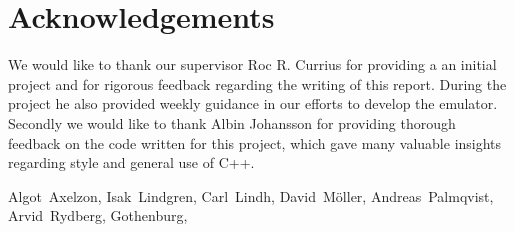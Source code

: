 \thispagestyle{plain}			%
\section*{\centering Acknowledgements}

We would like to thank our supervisor Roc R. Currius for providing a an initial project and for rigorous feedback regarding the writing of this report. During the project he also provided weekly guidance in our efforts to develop the emulator.
Secondly we would like to thank Albin Johansson for providing thorough feedback on the code written for this project, which gave many valuable insights regarding style and general use of C++. 

\vspace{1.5cm}
\hfill
Algot~Axelzon, Isak~Lindgren, Carl~Lindh, David~Möller, Andreas~Palmqvist, Arvid~Rydberg, Gothenburg, \monthname \space \the\year

\newpage				%
\thispagestyle{plain}
\mbox{}